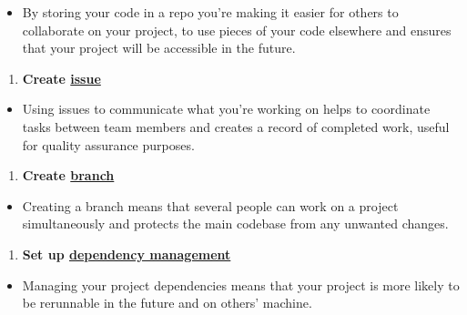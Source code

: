 \documentclass[]{book}
\providecommand{\tightlist}{%
  \setlength{\itemsep}{0pt}\setlength{\parskip}{0pt}}
\begin{document}
\begin{itemize}
\tightlist
\item
  By storing your code in a repo you're making it easier for others to collaborate on your project, to use pieces of your code elsewhere and ensures that your project will be accessible in the future.
\end{itemize}

\begin{enumerate}
\def\labelenumi{\arabic{enumi}.}
\setcounter{enumi}{1}
\tightlist
\item
  \textbf{Create \protect\hyperlink{versioncontrol}{issue}}\\
\end{enumerate}

\begin{itemize}
\tightlist
\item
  Using issues to communicate what you're working on helps to coordinate tasks between team members and creates a record of completed work, useful for quality assurance purposes.
\end{itemize}

\begin{enumerate}
\def\labelenumi{\arabic{enumi}.}
\setcounter{enumi}{2}
\tightlist
\item
  \textbf{Create \protect\hyperlink{versioncontrol}{branch}}\\
\end{enumerate}

\begin{itemize}
\tightlist
\item
  Creating a branch means that several people can work on a project simultaneously and protects the main codebase from any unwanted changes.\\
\end{itemize}

\begin{enumerate}
\def\labelenumi{\arabic{enumi}.}
\setcounter{enumi}{3}
\tightlist
\item
  \textbf{Set up \protect\hyperlink{projdep}{dependency management}}\\
\end{enumerate}

\begin{itemize}
\tightlist
\item
  Managing your project dependencies means that your project is more likely to be rerunnable in the future and on others' machine.\\
\end{itemize}
\end{document}
